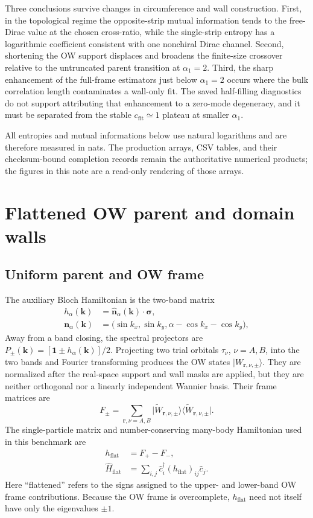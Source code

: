 \documentclass[aps,prb,twocolumn,nofootinbib,superscriptaddress,floatfix]{revtex4-2}
\newcommand{\cfit}{c_{\mathrm{fit}}}
\newcommand{\Hflat}{\hat H_{\mathrm{flat}}}
\newcommand{\hflat}{h_{\mathrm{flat}}}
\begin{document}
Three conclusions survive changes in circumference and wall construction.
First, in the topological regime the opposite-strip mutual information tends
to the free-Dirac value at the chosen cross-ratio, while the single-strip
entropy has a logarithmic coefficient consistent with one nonchiral Dirac
channel.  Second, shortening the OW support displaces and broadens the
finite-size crossover relative to the untruncated parent transition at
$\alpha_1=2$.  Third, the sharp enhancement of the full-frame estimators just
below $\alpha_1=2$ occurs where the bulk correlation length contaminates a
wall-only fit.  The saved half-filling diagnostics do not support attributing
that enhancement to a zero-mode degeneracy, and it must be separated from the
stable $\cfit\simeq1$ plateau at smaller $\alpha_1$.

All entropies and mutual informations below use natural logarithms and are
therefore measured in nats.  The production arrays, CSV tables, and their
checksum-bound completion records remain the authoritative numerical
products; the figures in this note are a read-only rendering of those arrays.

\section{Flattened OW parent and domain walls}
\label{sec:model}

\subsection{Uniform parent and OW frame}

The auxiliary Bloch Hamiltonian is the two-band matrix
\begin{align}
 h_{\alpha}(\bm k)
 &=\widehat{\bm n}_{\alpha}(\bm k)\cdot\bm\sigma,
 \\
 \bm n_{\alpha}(\bm k)
 &=\bigl(\sin k_x,\sin k_y,
 \alpha-\cos k_x-\cos k_y\bigr),
 \label{eq:bloch}
\end{align}
Away from a band closing, the spectral projectors are
$P_{\pm}(\bm k)=[\mathbf{1}\pm h_{\alpha}(\bm k)]/2$.
Projecting two trial orbitals
$\tau_{\nu}$, $\nu=A,B$, into the two bands and Fourier transforming produces
the OW states $\lvert W_{\bm r,\nu,\pm}\rangle$.  They are normalized after
the real-space support and wall masks are applied, but they are neither
orthogonal nor a linearly independent Wannier basis.  Their frame matrices are
\begin{equation}
 F_{\pm}=\sum_{\bm r,\nu=A,B}
 \lvert \widetilde W_{\bm r,\nu,\pm}\rangle
 \langle \widetilde W_{\bm r,\nu,\pm}\rvert.
 \label{eq:frame}
\end{equation}
The single-particle matrix and number-conserving many-body Hamiltonian used in
this benchmark are
\begin{align}
 \hflat&=F_+-F_-,
 \\
 \Hflat&=\sum_{i,j}\hat c_i^\dagger
 (\hflat)_{ij}\hat c_j.
 \label{eq:hflat}
\end{align}
Here ``flattened'' refers to the signs assigned to the upper- and lower-band
OW frame contributions.  Because the OW frame is overcomplete, $\hflat$ need
not itself have only the eigenvalues $\pm1$.
\end{document}
